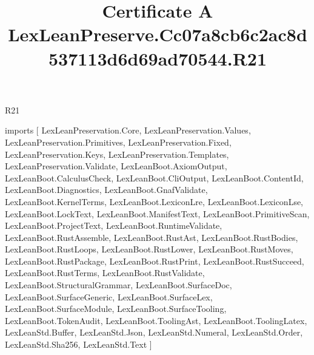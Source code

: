 \begin{lexlean}{R21}
\title{Certificate A LexLeanPreserve.Cc07a8cb6c2ac8d537113d6d69ad70544.R21}
\begin{coremodule}
imports [
  LexLeanPreservation.Core,
  LexLeanPreservation.Values,
  LexLeanPreservation.Primitives,
  LexLeanPreservation.Fixed,
  LexLeanPreservation.Keys,
  LexLeanPreservation.Templates,
  LexLeanPreservation.Validate,
  LexLeanBoot.AxiomOutput,
  LexLeanBoot.CalculusCheck,
  LexLeanBoot.CliOutput,
  LexLeanBoot.ContentId,
  LexLeanBoot.Diagnostics,
  LexLeanBoot.GnafValidate,
  LexLeanBoot.KernelTerms,
  LexLeanBoot.LexiconLre,
  LexLeanBoot.LexiconLse,
  LexLeanBoot.LockText,
  LexLeanBoot.ManifestText,
  LexLeanBoot.PrimitiveScan,
  LexLeanBoot.ProjectText,
  LexLeanBoot.RuntimeValidate,
  LexLeanBoot.RustAssemble,
  LexLeanBoot.RustAst,
  LexLeanBoot.RustBodies,
  LexLeanBoot.RustLoops,
  LexLeanBoot.RustLower,
  LexLeanBoot.RustMoves,
  LexLeanBoot.RustPackage,
  LexLeanBoot.RustPrint,
  LexLeanBoot.RustSucceed,
  LexLeanBoot.RustTerms,
  LexLeanBoot.RustValidate,
  LexLeanBoot.StructuralGrammar,
  LexLeanBoot.SurfaceDoc,
  LexLeanBoot.SurfaceGeneric,
  LexLeanBoot.SurfaceLex,
  LexLeanBoot.SurfaceModule,
  LexLeanBoot.SurfaceTooling,
  LexLeanBoot.TokenAudit,
  LexLeanBoot.ToolingAst,
  LexLeanBoot.ToolingLatex,
  LexLeanStd.Buffer,
  LexLeanStd.Json,
  LexLeanStd.Numeral,
  LexLeanStd.Order,
  LexLeanStd.Sha256,
  LexLeanStd.Text
]


\end{coremodule}
\end{lexlean}
